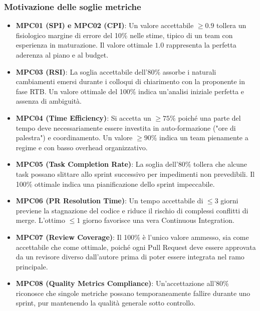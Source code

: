 \subsubsection*{Motivazione delle soglie metriche}
\begin{itemize}
    \item \textbf{MPC01 (SPI) e MPC02 (CPI)}: Un valore accettabile $\ge 0.9$ tollera un fisiologico margine di errore del 10\% nelle stime, tipico di un team con esperienza in maturazione. Il valore ottimale $1.0$ rappresenta la perfetta aderenza al piano e al budget.
    \item \textbf{MPC03 (RSI)}: La soglia accettabile dell'80\% assorbe i naturali cambiamenti emersi durante i colloqui di chiarimento con la proponente in fase RTB. Un valore ottimale del 100\% indica un'analisi iniziale perfetta e assenza di ambiguità.
    \item \textbf{MPC04 (Time Efficiency)}: Si accetta un $\ge 75\%$ poiché una parte del tempo deve necessariamente essere investita in auto-formazione ("ore di palestra") e coordinamento. Un valore $\ge 90\%$ indica un team pienamente a regime e con basso overhead organizzativo.
    \item \textbf{MPC05 (Task Completion Rate)}: La soglia dell'80\% tollera che alcune task possano slittare allo sprint successivo per impedimenti non prevedibili. Il 100\% ottimale indica una pianificazione dello sprint impeccabile.
    \item \textbf{MPC06 (PR Resolution Time)}: Un tempo accettabile di $\le 3$ giorni previene la stagnazione del codice e riduce il rischio di complessi conflitti di merge. L'ottimo $\le 1$ giorno favorisce una vera Continuous Integration.
    \item \textbf{MPC07 (Review Coverage)}: Il 100\% è l'unico valore ammesso, sia come accettabile che come ottimale, poiché ogni Pull Request deve essere approvata da un revisore diverso dall'autore prima di poter essere integrata nel ramo principale.
    \item \textbf{MPC08 (Quality Metrics Compliance)}: Un'accettazione all'80\% riconosce che singole metriche possano temporaneamente fallire durante uno sprint, pur mantenendo la qualità generale sotto controllo.
\end{itemize}